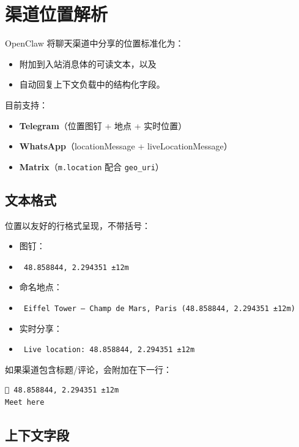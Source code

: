 \clearpage

\section{渠道位置解析}


OpenClaw 将聊天渠道中分享的位置标准化为：

\begin{itemize}
  \item 附加到入站消息体的可读文本，以及
  \item 自动回复上下文负载中的结构化字段。
\end{itemize}


目前支持：

\begin{itemize}
  \item \textbf{Telegram}（位置图钉 + 地点 + 实时位置）
  \item \textbf{WhatsApp}（locationMessage + liveLocationMessage）
  \item \textbf{Matrix}（\texttt{m.location} 配合 \texttt{geo\_uri}）
\end{itemize}


\subsection{文本格式}


位置以友好的行格式呈现，不带括号：

\begin{itemize}
  \item 图钉：
  \item \texttt{ 48.858844, 2.294351 ±12m}
  \item 命名地点：
  \item \texttt{ Eiffel Tower — Champ de Mars, Paris (48.858844, 2.294351 ±12m)}
  \item 实时分享：
  \item \texttt{ Live location: 48.858844, 2.294351 ±12m}
\end{itemize}


如果渠道包含标题/评论，会附加在下一行：

\begin{lstlisting}
📍 48.858844, 2.294351 ±12m
Meet here
\end{lstlisting}


\subsection{上下文字段}


